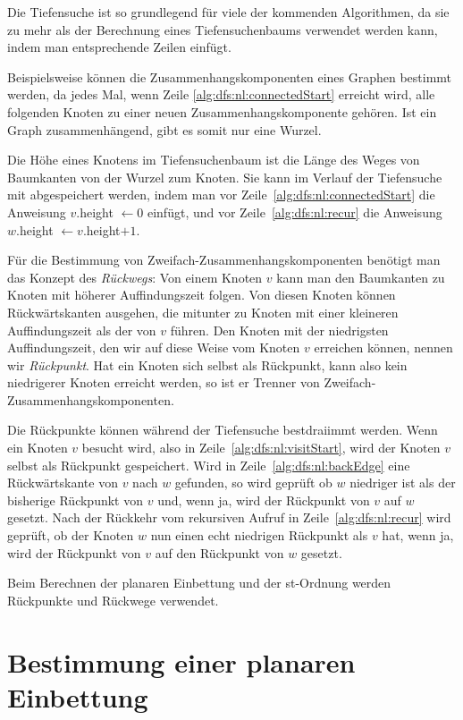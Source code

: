 \documentclass[a4paper]{scrreprt}
\theoremstyle{definition}
\begin{document}
Die Tiefensuche ist so grundlegend für viele der kommenden Algorithmen, da sie zu mehr als der Berechnung eines Tiefensuchenbaums verwendet werden kann, indem man entsprechende Zeilen einfügt. 

Beispielsweise können die Zusammenhangskomponenten eines Graphen bestimmt werden, da jedes Mal, wenn Zeile \ref{alg:dfs:nl:connectedStart} erreicht wird, alle folgenden Knoten zu einer neuen Zusammenhangskomponente gehören. Ist ein Graph zusammenhängend, gibt es somit nur eine Wurzel.

Die Höhe eines Knotens im Tiefensuchenbaum ist die Länge des Weges von Baumkanten von der Wurzel zum Knoten. Sie kann im Verlauf der Tiefensuche mit abgespeichert werden, indem man vor Zeile~\ref{alg:dfs:nl:connectedStart} die Anweisung $v.$height $\leftarrow 0$ einfügt, und vor Zeile~\ref{alg:dfs:nl:recur} die Anweisung $w.$height $\leftarrow v.$height$ + 1$.


Für die Bestimmung von Zweifach-Zusammenhangskomponenten benötigt man das Konzept des \emph{Rückwegs}: Von einem Knoten $v$ kann man den Baumkanten zu Knoten mit höherer Auffindungszeit folgen. Von diesen Knoten können Rückwärtskanten ausgehen, die mitunter zu Knoten mit einer kleineren Auffindungszeit als der von $v$ führen. Den Knoten mit der niedrigsten Auffindungszeit, den wir auf diese Weise vom Knoten $v$ erreichen können, nennen wir \emph{Rückpunkt}. Hat ein Knoten sich selbst als Rückpunkt, kann also kein niedrigerer Knoten erreicht werden, so ist er Trenner von Zweifach-Zusammenhangskomponenten.

Die Rückpunkte können während der Tiefensuche bestdraiimmt werden. Wenn ein Knoten $v$ besucht wird, also in Zeile~\ref{alg:dfs:nl:visitStart}, wird der Knoten $v$ selbst als Rückpunkt gespeichert. Wird in Zeile~\ref{alg:dfs:nl:backEdge} eine Rückwärtskante von $v$ nach $w$ gefunden, so wird geprüft ob $w$ niedriger ist als der bisherige Rückpunkt von $v$ und, wenn ja, wird der Rückpunkt von $v$ auf $w$ gesetzt. Nach der Rückkehr vom rekursiven Aufruf in Zeile~\ref{alg:dfs:nl:recur} wird geprüft, ob der Knoten $w$ nun einen echt niedrigen Rückpunkt als $v$ hat, wenn ja, wird der Rückpunkt von $v$ auf den Rückpunkt von $w$ gesetzt.

Beim Berechnen der planaren Einbettung und der st-Ordnung werden Rückpunkte und Rückwege verwendet.

\section{Bestimmung einer planaren Einbettung}
\end{document}
